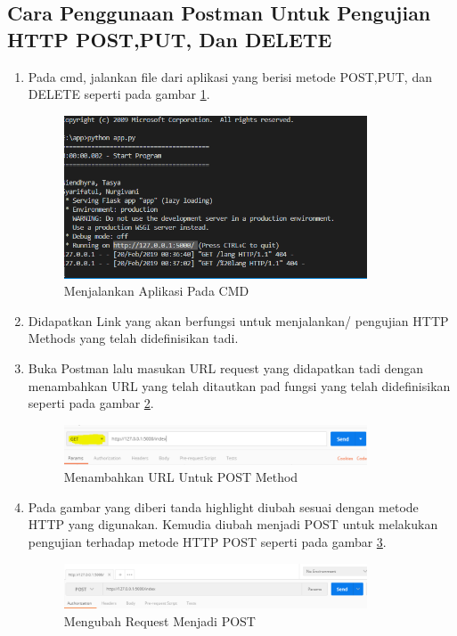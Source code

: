 \subsection{Cara Penggunaan Postman Untuk Pengujian HTTP POST,PUT, Dan DELETE}
\begin{enumerate}
\item Pada cmd, jalankan file dari aplikasi yang berisi metode POST,PUT, dan DELETE seperti pada gambar \ref{fig:jac}.
\begin{figure}[!htbp]
	\centerline{\includegraphics[width=0.85\textwidth]{figures/11/jac.PNG}}
	\caption{Menjalankan Aplikasi Pada CMD}
	\label{fig:jac}
\end{figure}

\item Didapatkan Link yang akan berfungsi untuk menjalankan/ pengujian HTTP Methods yang telah didefinisikan tadi.
\item Buka Postman lalu masukan URL request yang didapatkan tadi dengan menambahkan URL yang telah ditautkan pad fungsi yang telah didefinisikan seperti pada gambar \ref{fig:upm}.
\begin{figure}[!htbp]
	\centerline{\includegraphics[width=0.85\textwidth]{figures/11/upm.PNG}}
	\caption{Menambahkan URL Untuk POST Method}
	\label{fig:upm}
\end{figure}

\item Pada gambar yang diberi tanda highlight diubah sesuai dengan metode HTTP yang digunakan. Kemudia diubah menjadi POST untuk melakukan pengujian terhadap metode HTTP POST seperti pada gambar \ref{fig:urp}.
\begin{figure}[!htbp]
	\centerline{\includegraphics[width=0.85\textwidth]{figures/11/urp.PNG}}
	\caption{Mengubah Request Menjadi POST}
	\label{fig:urp}
\end{figure}


\end{enumerate}
